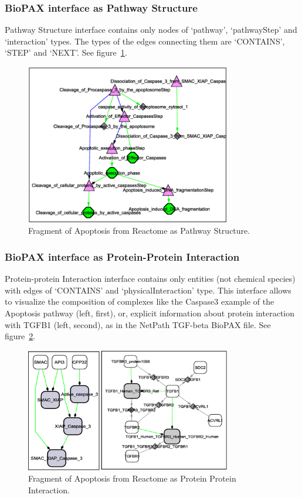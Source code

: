 \subsubsection{BioPAX interface as Pathway Structure}
Pathway Structure interface contains only nodes of ‘pathway’, ‘pathwayStep’ and ‘interaction’ types. The types of the edges connecting them are ‘CONTAINS’, ‘STEP’ and ‘NEXT’.  See figure~\ref{BioPAX_pathway_structure}.
\begin{figure}
\centering
\includegraphics[width=0.8\textwidth]{graphics/BioPAX_pathway_structure}
\caption{Fragment of Apoptosis from Reactome as Pathway Structure.}
\label{BioPAX_pathway_structure}
\end{figure}
\subsubsection{BioPAX interface as Protein-Protein Interaction}
Protein-protein Interaction interface contains only entities (not chemical species) with edges of ‘CONTAINS’ and ‘physicalInteraction’ type. This interface allows to visualize the composition of complexes like the Caspase3 example of the Apoptosis pathway (left, first), or, explicit information about protein interaction with TGFB1 (left, second), as in the NetPath TGF-beta BioPAX file.  See figure~\ref{BioPAX_protein_protein_interaction}.
\begin{figure}
\centering
\includegraphics[width=0.8\textwidth]{graphics/BioPAX_protein_protein_interaction}
\caption{Fragment of Apoptosis from Reactome as Protein Protein Interaction.}
\label{BioPAX_protein_protein_interaction}
\end{figure}

